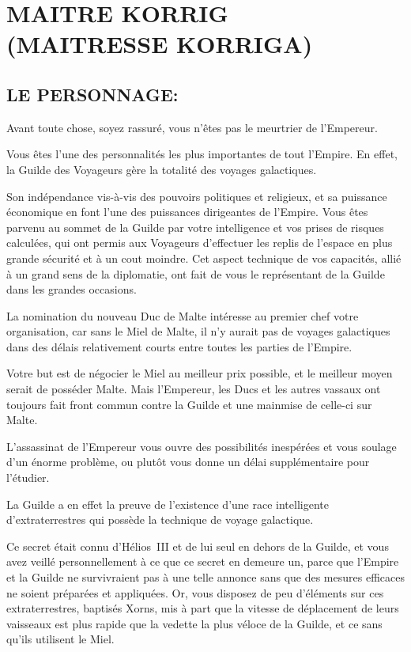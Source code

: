 \documentclass[14pt,twocolumn]{extarticle}
\begin{document}
\section{MAITRE KORRIG\\(MAITRESSE KORRIGA)}

\subsection{LE PERSONNAGE:}

Avant toute chose, soyez rassuré, vous n'êtes pas le meurtrier de l'Empereur.

Vous êtes l'une des personnalités les plus importantes de tout l'Empire. En
effet, la Guilde des Voyageurs gère la totalité des voyages galactiques.

Son indépendance vis-à-vis des pouvoirs politiques et religieux, et sa
puissance économique en font l'une des puissances dirigeantes de l'Empire. Vous
êtes parvenu au sommet de la Guilde par votre intelligence et vos prises de
risques calculées, qui ont permis aux Voyageurs d'effectuer \og les replis de
l'espace\fg{} en plus grande sécurité et à un cout moindre. Cet aspect
technique de vos capacités, allié à un grand sens de la diplomatie, ont fait de
vous le représentant de la Guilde dans les grandes occasions.

La nomination du nouveau Duc de Malte intéresse au premier chef votre
organisation, car sans le Miel de Malte, il n'y aurait pas de voyages
galactiques dans des délais relativement courts entre toutes les parties de
l'Empire.

Votre but est de négocier le Miel au meilleur prix possible, et le meilleur
moyen serait de posséder Malte. Mais l'Empereur, les Ducs et les autres vassaux
ont toujours fait front commun contre la Guilde et une mainmise de celle-ci
sur Malte.

L'assassinat de l'Empereur vous ouvre des possibilités inespérées et vous
soulage d'un énorme problème, ou plutôt vous donne un délai supplémentaire pour
l'étudier.

La Guilde a en effet la preuve de l'existence d'une race intelligente
d'extraterrestres qui possède la technique de voyage galactique.

Ce secret était connu d'Hélios~III et de lui seul en dehors de la Guilde, et
vous avez veillé personnellement à ce que ce secret en demeure un, parce que
l'Empire et la Guilde ne survivraient pas à une telle annonce sans que des
mesures efficaces ne soient préparées et appliquées. Or, vous disposez de peu
d'éléments sur ces extraterrestres, baptisés Xorns, mis à part que la vitesse
de déplacement de leurs vaisseaux est plus rapide que la vedette la plus véloce
de la Guilde, et ce sans qu'ils utilisent le Miel.
\end{document}
